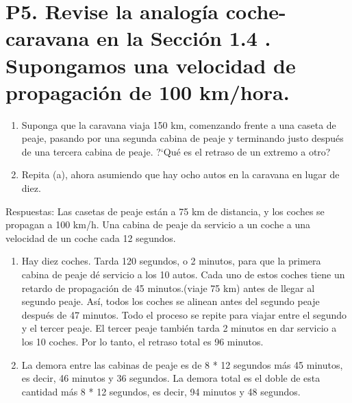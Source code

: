 \documentclass[a4paper, 11pt]{article}
\theoremstyle{definition} \theoremstyle{remark}
\begin{document}
     \section{P5. Revise la analog\'ia coche-caravana en la Secci\'on 1.4 . Supongamos una velocidad de propagaci\'on de 100 km/hora.}
     \renewcommand{\theenumi}{\alph{enumi}}
     \begin{enumerate}
       \item Suponga que la caravana viaja 150 km, comenzando frente a una caseta de peaje, pasando por una segunda cabina de peaje y terminando justo despu\'es de una tercera cabina de peaje. ?`Qu\'e es el retraso de un extremo a otro?
       \item Repita (a), ahora asumiendo que hay ocho autos en la caravana en lugar de diez.
     \end{enumerate}
     Respuestas:
     Las casetas de peaje est\'an a 75 km de distancia, y los coches se propagan a 100 km/h. Una cabina de peaje da servicio a un coche a una velocidad de un coche cada 12 segundos.
     \renewcommand{\theenumi}{\alph{enumi}}
     \begin{enumerate}
       \item Hay diez coches. Tarda 120 segundos, o 2 minutos, para que la primera cabina de peaje d\'e servicio a los 10 autos. Cada uno de estos coches tiene un retardo de propagaci\'on de 45 minutos.(viaje 75 km) antes de llegar al segundo peaje. As\'i, todos los coches se alinean antes del segundo peaje despu\'es de 47 minutos. Todo el proceso se repite para viajar entre el segundo y el tercer peaje. El tercer peaje tambi\'en tarda 2 minutos en dar servicio a los 10 coches. Por lo tanto, el retraso total es 96 minutos.
       \item La demora entre las cabinas de peaje es de 8 * 12 segundos m\'as 45 minutos, es decir, 46 minutos y 36 segundos. La demora total es el doble de esta cantidad m\'as 8 * 12 segundos, es decir, 94 minutos y 48 segundos.
     \end{enumerate}
\end{document}
